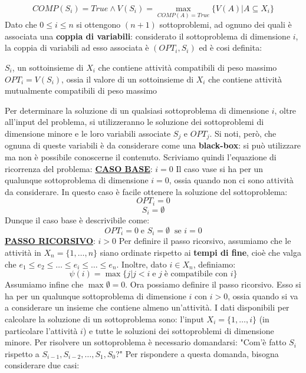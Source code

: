 \documentclass[12pt]{article}
\begin{document}
$$COMP(S_i) = True \land V(S_i) = \max_{COMP(A) = True}\{V(A)|A \subseteq X_i\}$$
Dato che $0 \leq i \leq n$ si ottengono $(n+1)$ sottoproblemi, ad ognuno dei quali è associata una \textbf{coppia di variabili}:
considerato il sottoproblema di dimensione $i$, la coppia di variabili ad esso associata è $(OPT_i, S_i)$ ed è cosi definita:
\begin{center}
    $S_i$, un sottoinsieme di $X_i$ che contiene attività compatibili di peso massimo
    $OPT_i = V(S_i)$, ossia il valore di un sottoinsieme di $X_i$ che contiene attività mutualmente compatibili di peso massimo \\
\end{center}
Per determinare la soluzione di un qualsiasi sottoproblema di dimensione $i$, oltre all'input del problema, si utilizzeranno le soluzione dei sottoproblemi di dimensione minore e le loro variabili associate $S_j$ e $OPT_j$.
Si noti, però, che ognuna di queste variabili è da considerare come una \textbf{black-box}: si può utilizzare ma non è possibile conoscerne il contenuto.
Scriviamo quindi l'equazione di ricorrenza del problema: \newline
\textbf{\underline{CASO BASE}}: $i = 0$ \newline
Il caso vase si ha per un qualunque sottoproblema di dimensione $i = 0$, ossia quando non ci sono attività da considerare. In questo caso è facile ottenere la soluzione del sottoproblema:
$$OPT_i = 0$$
$$S_i = \emptyset$$
Dunque il caso base è descrivibile come:
$$OPT_i = 0 \; \textrm{e } S_i = \emptyset \; \; \textrm{se } i = 0$$
\textbf{\underline{PASSO RICORSIVO}}: $i > 0$
Per definire il passo ricorsivo, assumiamo che le attività in $X_n = \{1,\dots,n\}$ siano ordinate rispetto ai \textbf{tempi di fine}, cioè che valga che \newline $e_1 \leq e_2 \leq \dots \leq e_i \leq \dots \leq e_n$. Inoltre, dato
$i \in X_n$, definiamo:
$$\psi(i) = \max\{j|j < i \; \textrm{e } j \; \textrm{è compatibile con } i\}$$
Assumiamo infine che $\max \emptyset = 0$. \newline
Ora possiamo definire il passo ricorsivo. Esso si ha per un qualunque sottoproblema di dimensione $i$ con $i > 0$, ossia quando si va a considerare un insieme che contiene almeno un'attività.
I dati disponibili per calcolare la soluzione di un sottoproblema sono: l'input $X_i = \{1,\dots,i\}$ (in particolare l'attività $i$) e tutte le soluzioni dei sottoproblemi di dimensione minore.
Per risolvere un sottoproblema è necessario domandarsi: "Com'è fatto $S_i$ rispetto a $S_{i-1}, S_{i-2}, \dots, S_1, S_0$?" Per rispondere a questa domanda, bisogna considerare due casi:
\end{document}
